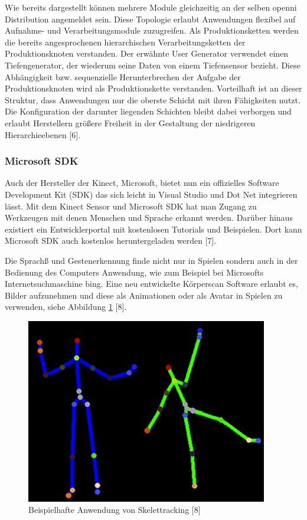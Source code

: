 Wie bereits dargestellt können mehrere Module gleichzeitig an der selben \gls{openni} Distribution angemeldet sein.
 Diese Topologie erlaubt Anwendungen flexibel auf Aufnahme- und Verarbeitungsmodule zuzugreifen.
 Als Produktionsketten werden die bereits angesprochenen hierarchischen Verarbeitungsketten der Produktionsknoten verstanden.
 Der erwähnte User Generator verwendet einen Tiefengenerator, der wiederum seine Daten von einem Tiefensensor bezieht.
 Diese Abhängigkeit bzw. sequenzielle Herunterbrechen der Aufgabe der Produktionsknoten wird als Produktionskette verstanden.
 Vorteilhaft ist an dieser Struktur, dass Anwendungen nur die oberste Schicht mit ihren Fähigkeiten nutzt.
 Die Konfiguration der darunter liegenden Schichten bleibt dabei verborgen und erlaubt Herstellern größere Freiheit
 in der Gestaltung der niedrigeren Hierarchieebenen [6].

\subsubsection{Microsoft SDK}

Auch der Hersteller der Kinect, Microsoft, bietet nun ein offizielles Software Development Kit (SDK)
 das sich leicht in Visual Studio und Dot Net integrieren lässt. Mit dem Kinect Sensor und Microsoft SDK
 hat man Zugang zu Werkzeugen mit denen Menschen und Sprache erkannt werden.
 Darüber hinaus existiert ein Entwicklerportal mit kostenlosen Tutorials und Beispielen.
 Dort kann Microsoft SDK auch kostenlos heruntergeladen werden [7].

Die Sprachß und Gestenerkennung finde nicht nur in Spielen sondern auch in der Bedienung des Computers Anwendung,
 wie zum Beispiel bei Microsofts Internetsuchmaschine bing. Eine neu entwickelte Körperscan Software erlaubt es,
 Bilder aufzunehmen und diese als Animationen oder als Avatar in Spielen zu
 verwenden, siehe Abbildung \ref{fig:skelettracking} [8].

\begin{figure}[h]
\center
\includegraphics[scale=0.8]{graphics/skelettracking.jpg}
\caption{\label{fig:skelettracking} Beispielhafte Anwendung von Skelettracking
[8]}
\end{figure}
